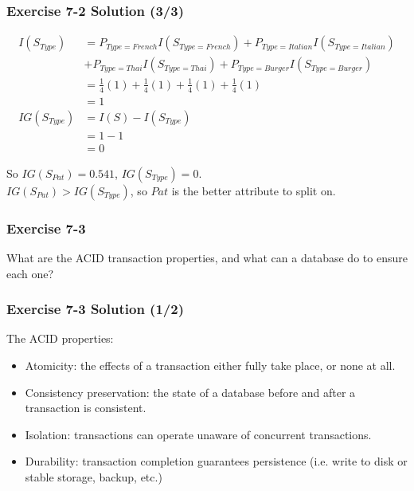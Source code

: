 \begin{frame}
\frametitle{Exercise 7-2 Solution (3/3)}

\begin{align*}
  I(S_{Type}) &= P_{Type=French}I(S_{Type=French}) + P_{Type=Italian}I(S_{Type=Italian}) \\
  &+ P_{Type=Thai}I(S_{Type=Thai}) + P_{Type=Burger}I(S_{Type=Burger}) \\
  &= \frac{1}{4}(1) + \frac{1}{4}(1) + \frac{1}{4}(1) + \frac{1}{4}(1) \\
  &= 1 \\
  IG(S_{Type}) &= I(S) - I(S_{Type}) \\
  &= 1 - 1 \\
  &= 0
\end{align*}

So $IG(S_{Pat}) = 0.541$, $IG(S_{Type}) = 0$. \\
$IG(S_{Pat}) > IG(S_{Type})$, so $Pat$ is the better attribute to split on.

\end{frame}


\begin{frame}
\frametitle{Exercise 7-3}

What are the ACID transaction properties, and what can a database do to ensure each one?

\end{frame}


\begin{frame}
\frametitle{Exercise 7-3 Solution (1/2)}

The ACID properties:

\begin{itemize}
  \item Atomicity: the effects of a transaction either fully take place, or none at all.
  \item Consistency preservation: the state of a database before and after a transaction is consistent.
  \item Isolation: transactions can operate unaware of concurrent transactions.
  \item Durability: transaction completion guarantees persistence (i.e. write to disk or stable storage, backup, etc.)
\end{itemize}

\end{frame}


